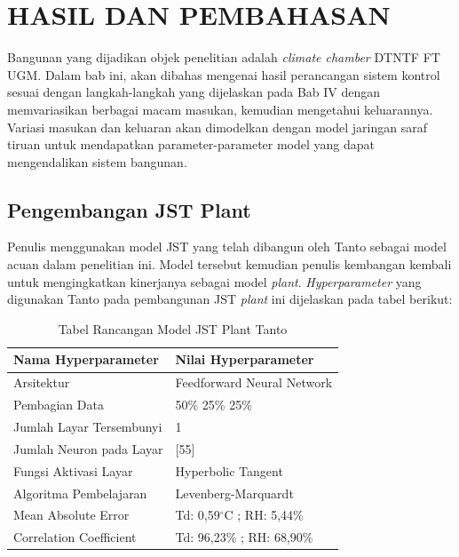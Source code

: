 \chapter{HASIL DAN PEMBAHASAN}
\label{hasil-dan-pembahasan}
Bangunan yang dijadikan objek penelitian adalah \textit{climate chamber} DTNTF FT UGM. Dalam bab ini, akan dibahas mengenai hasil perancangan sistem kontrol sesuai dengan langkah-langkah yang dijelaskan pada Bab IV dengan memvariasikan berbagai macam masukan, kemudian mengetahui keluarannya. Variasi masukan dan keluaran akan dimodelkan dengan model jaringan saraf tiruan untuk mendapatkan parameter-parameter model yang dapat mengendalikan sistem bangunan.

\section{Pengembangan JST Plant}

Penulis menggunakan model JST yang telah dibangun oleh Tanto\cite{skripsiTanto} sebagai model acuan dalam penelitian ini. Model tersebut kemudian penulis kembangan kembali untuk mengingkatkan kinerjanya sebagai model \textit{plant}. \textit{Hyperparameter} yang digunakan Tanto pada pembangunan JST \textit{plant }ini dijelaskan pada tabel berikut:

\begin{table}[!h]
	\caption{Tabel Rancangan Model JST Plant Tanto}
	\label{tbl:5:NNPlantTanto}
	\centering
	\begin{tabular}{|p{5.7cm}|p{5cm}|}
		\hline
		\textbf{Nama Hyperparameter} & \textbf{Nilai Hyperparameter} \\ \hline
		Arsitektur & Feedforward Neural Network \\ \hline
		Pembagian Data & 50\% 25\% 25\% \\ \hline 
		Jumlah Layar Tersembunyi & 1 \\ \hline
		Jumlah Neuron pada Layar & [55] \\ \hline
		Fungsi Aktivasi Layar & Hyperbolic Tangent \\ \hline
		Algoritma Pembelajaran & Levenberg-Marquardt \\ \hline
		Mean Absolute Error & Td: 0,59$^\circ$C ; RH: 5,44\% \\ \hline
		Correlation Coefficient & Td: 96,23\% ; RH: 68,90\% \\ \hline
	\end{tabular}
\end{table}


